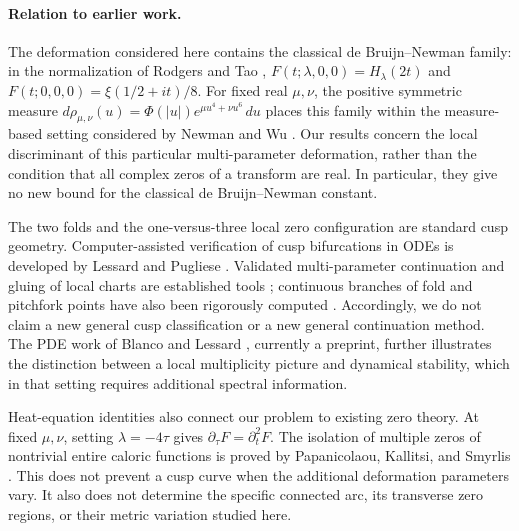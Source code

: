 
\paragraph{Relation to earlier work.}
The deformation considered here contains the classical de Bruijn--Newman
family: in the normalization of Rodgers and Tao \cite{RodgersTao2020},
\(F(t;\lambda,0,0)=H_\lambda(2t)\) and
\(F(t;0,0,0)=\xi(1/2+it)/8\).
For fixed real \(\mu,\nu\), the positive symmetric measure
\(d\rho_{\mu,\nu}(u)=\Phi(|u|)e^{\mu u^4+\nu u^6}\,du\)
places this family within the measure-based setting considered by
Newman and Wu \cite{NewmanWu2020}.
Our results concern the local discriminant of this particular
multi-parameter deformation, rather than the condition that all complex
zeros of a transform are real. In particular, they give no new bound
for the classical de Bruijn--Newman constant.

The two folds and the one-versus-three local zero configuration are
standard cusp geometry. Computer-assisted verification of cusp
bifurcations in ODEs is developed by Lessard and Pugliese
\cite{LessardPugliese2025}. Validated multi-parameter continuation and
gluing of local charts are established tools \cite{GameiroLessardPugliese2016};
continuous branches of fold and pitchfork points have also been
rigorously computed \cite{LessardSanderWanner2017}.
Accordingly, we do not claim a new general cusp classification or a new
general continuation method. The PDE work of Blanco and Lessard
\cite{BlancoLessard2026}, currently a preprint, further illustrates the
distinction between a local multiplicity picture and dynamical
stability, which in that setting requires additional spectral information.

Heat-equation identities also connect our problem to existing zero
theory. At fixed \(\mu,\nu\), setting \(\lambda=-4\tau\) gives
\(\partial_\tau F=\partial_t^2F\).
The isolation of multiple zeros of nontrivial entire caloric functions
is proved by Papanicolaou, Kallitsi, and Smyrlis
\cite[Theorem~4.1]{PapanicolaouKallitsiSmyrlis2021}.
This does not prevent a cusp curve when the additional deformation
parameters vary. It also does not determine the specific connected
arc, its transverse zero regions, or their metric variation studied here.

